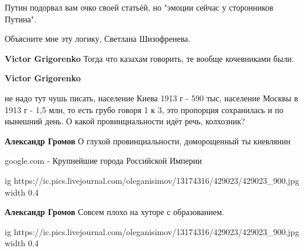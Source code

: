 \begin{itemize}
\begin{itemize}
Путин подорвал вам очко своей статьёй, но "эмоции сейчас у сторонников Путина".

Объясните мне эту логику, Светлана Шизофренева.

 
\textbf{Victor Grigorenko} Тогда что казахам говорить, те вообще кочевниками были.

 
\textbf{Victor Grigorenko} 

не надо тут чушь писать, население Киева 1913 г - 590 тыс, население Москвы в
1913 г - 1,5 млн, то есть грубо говоря 1 к 3, это пропорция сохранилась и по
нынешний день. О какой провинциальности идёт речь, колхозник?

 
\textbf{Александр Громов} О глухой провинциальности, доморощенный ты киевлянин

google.com - Крупнейшие города Российской Империи

 
\ifcmt
  ig https://ic.pics.livejournal.com/oleganisimov/13174316/429023/429023_900.jpg
  width 0.4
\fi


 
\textbf{Александр Громов} Совсем плохо на хуторе с образованием.

\ifcmt
  ig https://ic.pics.livejournal.com/oleganisimov/13174316/429023/429023_900.jpg
  width 0.4
\fi


\end{itemize}
\end{itemize}
